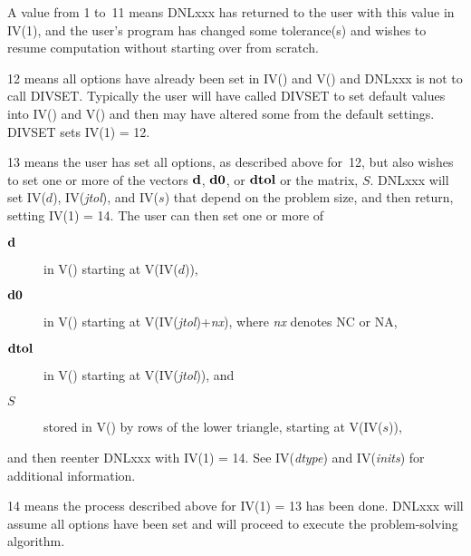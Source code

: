 \documentclass[twoside]{MATH77}
\begin{document}
A value from 1 to~11 means DNLxxx has returned to the user with this value
in IV(1), and the user's program has changed some tolerance(s) and wishes to
resume computation without starting over from scratch.

12 means all options have already been set in IV() and V() and DNLxxx is not
to call DIVSET. Typically the user will have called DIVSET to set default
values into IV() and V() and then may have altered some from the default
settings. DIVSET sets IV(1) = 12.

13 means the user has set all options, as described above for~12, but also
wishes to set one or more of the vectors ${\bf d}$, ${\bf d0}$, or ${\bf dtol}$ or the matrix, $S$.
DNLxxx will set IV($d$), IV({\em jtol}), and IV($s$) that depend on the problem size,
and then return, setting IV(1) = 14. The user can then set one or more of
\begin{description}
\item[${\bf d}$] in V() starting at V(IV($d$)),

\item[${\bf d0}$] in V() starting at V(IV({\em jtol})+{\em nx}), where {\em nx} denotes NC or NA,

\item[${\bf dtol}$] in V() starting at V(IV({\em jtol})), and

\item[$S$] stored in V() by rows of the lower triangle, starting at V(IV($s$)),
\end{description}
and then reenter DNLxxx with IV(1) = 14. See IV({\em dtype}) and IV({\em inits}) for
additional information.

14 means the process described above for IV(1) = 13 has been done. DNLxxx
will assume all options have been set and will proceed to execute the
problem-solving algorithm.
\end{document}
